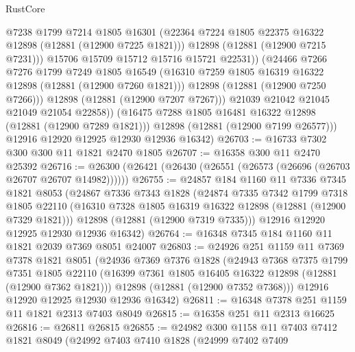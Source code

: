 \begin{lexlean}{RustCore}
\begin{coremodule}
                    @7238
                    @1799
                    @7214
                    @1805
                    @16301
                    (@22364 @7224 @1805 @22375 @16322 @12898 (@12881 (@12900 @7225 @1821)))
                    @12898
                    (@12881 (@12900 @7215 @7231)))
                  @15706
                  @15709
                  @15712
                  @15716
                  @15721
                  @22531))
              (@24466
                @7266
                @7276
                @1799
                @7249
                @1805
                @16549
                (@16310 @7259 @1805 @16319 @16322 @12898 (@12881 (@12900 @7260 @1821)))
                @12898
                (@12881 (@12900 @7250 @7266)))
              @12898
              (@12881 (@12900 @7207 @7267)))
            @21039
            @21042
            @21045
            @21049
            @21054
            @22858))
        (@16475 @7288 @1805 @16481 @16322 @12898 (@12881 (@12900 @7289 @1821)))
        @12898
        (@12881 (@12900 @7199 @26577)))
      @12916
      @12920
      @12925
      @12930
      @12936
      @16342)
@26703 := @16733 @7302 @300 @300 @11 @1821 @2470 @1805
@26707 := @16358 @300 @11 @2470 @25392
@26716 := @26300 (@26421 (@26430 (@26551 (@26573 (@26696 (@26703 @26707 @26707 @14982))))))
@26755 := @24857
    @184
    @1160
    @11
    @7336
    @7345
    @1821
    @8053
    (@24867
      @7336
      @7343
      @1828
      (@24874
        @7335
        @7342
        @1799
        @7318
        @1805
        @22110
        (@16310 @7328 @1805 @16319 @16322 @12898 (@12881 (@12900 @7329 @1821)))
        @12898
        (@12881 (@12900 @7319 @7335)))
      @12916
      @12920
      @12925
      @12930
      @12936
      @16342)
@26764 := @16348 @7345 @184 @1160 @11 @1821 @2039 @7369 @8051 @24007
@26803 := @24926
    @251
    @1159
    @11
    @7369
    @7378
    @1821
    @8051
    (@24936
      @7369
      @7376
      @1828
      (@24943
        @7368
        @7375
        @1799
        @7351
        @1805
        @22110
        (@16399 @7361 @1805 @16405 @16322 @12898 (@12881 (@12900 @7362 @1821)))
        @12898
        (@12881 (@12900 @7352 @7368)))
      @12916
      @12920
      @12925
      @12930
      @12936
      @16342)
@26811 := @16348 @7378 @251 @1159 @11 @1821 @2313 @7403 @8049
@26815 := @16358 @251 @11 @2313 @16625
@26816 := @26811 @26815
@26855 := @24982
    @300
    @1158
    @11
    @7403
    @7412
    @1821
    @8049
    (@24992
      @7403
      @7410
      @1828
      (@24999
        @7402
        @7409

\end{coremodule}
\end{lexlean}
